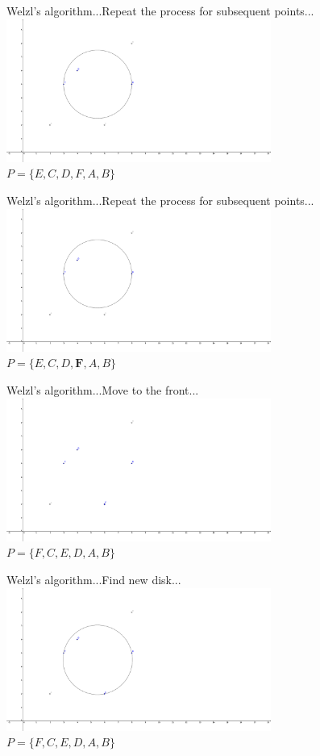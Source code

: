 \documentclass{beamer}
\begin{document}
\begin{frame}{Welzl's algorithm...}{Repeat the process for subsequent points...}
    \centering
    \includegraphics[trim=0 0 7cm 0,clip,width=0.65\textwidth]{figures/SEC05} \\
    $P = \{E, C, D, F, A, B\}$
\end{frame}
\begin{frame}{Welzl's algorithm...}{Repeat the process for subsequent points...}
    \centering
    \includegraphics[trim=0 0 7cm 0,clip,width=0.65\textwidth]{figures/SEC05} \\
    $P = \{E, C, D, \mathbf{F}, A, B\}$
\end{frame}
\begin{frame}{Welzl's algorithm...}{Move to the front...}
    \centering
    \includegraphics[trim=0 0 7cm 0,clip,width=0.65\textwidth]{figures/SEC06} \\
    $P = \{F, C, E, D, A, B\}$
\end{frame}
\begin{frame}{Welzl's algorithm...}{Find new disk...}
    \centering
    \includegraphics[trim=0 0 7cm 0,clip,width=0.65\textwidth]{figures/SEC07} \\
    $P = \{F, C, E, D, A, B\}$
\end{frame}
\end{document}
